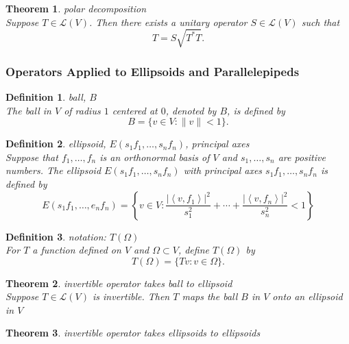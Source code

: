 \documentclass{article}
\newtheorem{theorem}{Theorem}[subsection]
\newtheorem{definition}{Definition}[subsection]
\begin{document}
\begin{CJK}{UTF8}{gkai}
\begin{theorem}
    polar decomposition\\

    Suppose $T \in \mathcal{L}(V)$. Then there exists a unitary operator $S \in \mathcal{L}(V)$ such that
    \[T =S\sqrt{T^\ast T}.\]
\end{theorem}

\subsubsection{Operators Applied to Ellipsoids and Parallelepipeds}

\begin{definition}
    ball, $B$\\

    The ball in $V$ of radius $1$ centered at $0$, denoted by $B$, is defined by
    \[B = \{v \in V:\|v\| < 1 \}.\]
\end{definition}

\begin{definition}
    ellipsoid, $E(s_1 f_1,\ldots,s_n f_n)$, principal axes\\

    Suppose that $f_1,\ldots, f_n$ is an orthonormal basis of $V$ and $s_1,\ldots,s_n$ are positive numbers. The ellipsoid $E(s_1 f_1,\ldots,s_n f_n)$ with principal axes $s_1 f_1,\ldots,s_n f_n$ is defined by
    \[E(s_1f_1,\ldots,e_n f_n) = \left\{v \in V :\dfrac{\left|\left<v,f_1\right>\right|^2}{s_1^2} + \cdots + \dfrac{\left|\left<v,f_n\right>\right|^2}{s_n^2} < 1\right\}\]
\end{definition}

\begin{definition}
    notation: $T(\Omega)$\\

    For $T$ a function defined on $V$ and $\Omega \subset V$, define $T(\Omega)$ by
    \[T(\Omega) = \{Tv : v \in \Omega\}.\]
\end{definition}

\begin{theorem}
    invertible operator takes ball to ellipsoid\\
    
    Suppose $T \in \mathcal{L}(V)$ is invertible. Then $T$ maps the ball $B$ in $V$ onto an ellipsoid in $V$
\end{theorem}

\begin{theorem}
    invertible operator takes ellipsoids to ellipsoids\\


\end{theorem}
\end{CJK}
\end{document}
